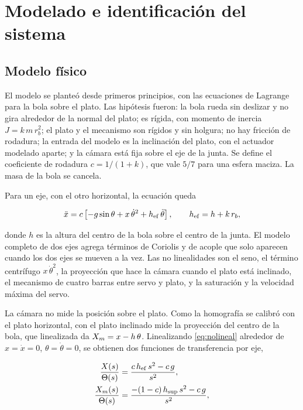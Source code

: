 \section{Modelado e identificación del sistema}

\subsection{Modelo físico}

El modelo se planteó desde primeros principios, con las ecuaciones de Lagrange para la bola
sobre el plato. Las hipótesis fueron: la bola rueda sin deslizar y no gira alrededor de la normal
del plato; es rígida, con momento de inercia $J = k\,m\,r_b^2$; el plato y el mecanismo son
rígidos y sin holgura; no hay fricción de rodadura; la entrada del modelo es la inclinación del
plato, con el actuador modelado aparte; y la cámara está fija sobre el eje de la junta. Se define
el coeficiente de rodadura $c = 1/(1+k)$, que vale $5/7$ para una esfera maciza. La masa de la
bola se cancela.

Para un eje, con el otro horizontal, la ecuación queda

\begin{equation}
\ddot x = c\left[-g\sin\theta + x\,\dot\theta^{2} + h_{\mathrm{ef}}\,\ddot\theta\right],
\qquad h_{\mathrm{ef}} = h + k\,r_b,
\label{eq:nolineal}
\end{equation}

donde $h$ es la altura del centro de la bola sobre el centro de la junta. El modelo completo de
dos ejes agrega términos de Coriolis y de acople que solo aparecen cuando los dos ejes se mueven
a la vez. Las no linealidades son el seno, el término centrífugo $x\,\dot\theta^{2}$, la
proyección que hace la cámara cuando el plato está inclinado, el mecanismo de cuatro barras
entre servo y plato, y la saturación y la velocidad máxima del servo.

La cámara no mide la posición sobre el plato. Como la homografía se calibró con el plato
horizontal, con el plato inclinado mide la proyección del centro de la bola, que linealizada da
$X_m = x - h\,\theta$. Linealizando \eqref{eq:nolineal} alrededor de $x = \dot x = 0$,
$\theta = \dot\theta = 0$, se obtienen dos funciones de transferencia por eje,

\begin{align}
\frac{X(s)}{\Theta(s)} &= \frac{c\,h_{\mathrm{ef}}\,s^{2} - c\,g}{s^{2}},
\label{eq:lineal}\\
\frac{X_m(s)}{\Theta(s)} &= \frac{-(1-c)\,h_{\mathrm{sup}}\,s^{2} - c\,g}{s^{2}},
\label{eq:linealm}
\end{align}

